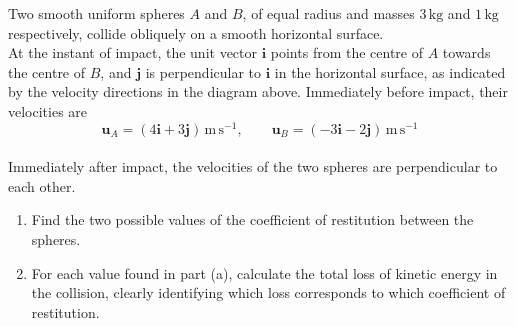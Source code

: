 \documentclass[leqno]{article}
\begin{document}
\begin{enumerate}[
  label=\textbf{\arabic*.},
  leftmargin=*,
  topsep=0pt,
  partopsep=0pt,
  parsep=0pt
]
\begin{djsSolution}
\end{djsSolution}

\newpage

\questionitem

\begin{figure}[H]
    \centering
{}
\end{figure}


Two smooth uniform spheres $A$ and $B$, of equal radius and masses $3\,\mathrm{kg}$ and $1\,\mathrm{kg}$ respectively, collide obliquely on a smooth horizontal surface. \\

At the instant of impact, the unit vector $\mathbf{i}$ points from the centre of $A$ towards the centre of $B$, and $\mathbf{j}$ is perpendicular to $\mathbf{i}$ in the horizontal surface, as indicated by the velocity directions in the diagram above. Immediately before impact, their velocities are
\[
\mathbf{u}_A=(4\mathbf{i}+3\mathbf{j})\,\mathrm{m\,s^{-1}},\qquad \mathbf{u}_B=(-3\mathbf{i}-2\mathbf{j})\,\mathrm{m\,s^{-1}}
\] \\
Immediately after impact, the velocities of the two spheres are perpendicular to each other. \\
\begin{enumerate}[label=\textbf{(\alph*)}]
\item Find the two possible values of the coefficient of restitution between the spheres.  \\
\item For each value found in part (a), calculate the total loss of kinetic energy in the collision, clearly identifying which loss corresponds to which coefficient of restitution.  \\
\end{enumerate}


\end{enumerate}
\end{document}

